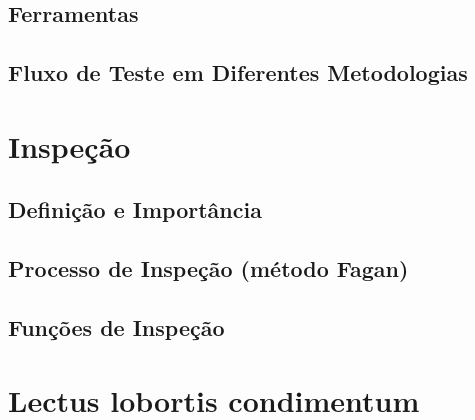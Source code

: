 \documentclass[
	12pt,				%
	openright,			%
	twoside,			%
	a4paper,			%
	english,			%
	brazil,				%
	]{abntex2}
\begin{document}
\section{Ferramentas}

\section{Fluxo de Teste em Diferentes Metodologias}

\chapter{Inspeção}

\section{Definição e Importância}

\section{Processo de Inspeção (método Fagan)}

\section{Funções de Inspeção}



\chapter{Lectus lobortis condimentum}
\end{document}
